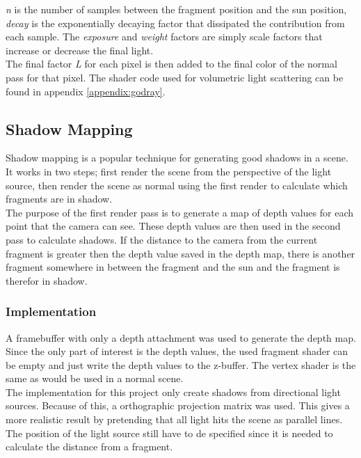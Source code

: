 \documentclass{article}
\begin{document}
  			\textit{n} is the number of samples between the fragment position and the sun position, \textit{decay} is the exponentially decaying factor that dissipated the contribution from each sample. The \textit{exposure} and \textit{weight} factors are simply scale factors that increase or decrease the final light. \\
  			
  			The final factor \textit{L} for each pixel is then added to the final color of the normal pass for that pixel. The shader code used for volumetric light scattering can be found in appendix \ref{appendix:godray}.
  		
  		\subsection{Shadow Mapping}
  			Shadow mapping is a popular technique for generating good shadows in a scene. It works in two steps; first render the scene from the perspective of the light source, then render the scene as normal using the first render to calculate which fragments are in shadow. \citep{ragnemalm2015so} \\
  			
  			The purpose of the first render pass is to generate a map of depth values for each point that the camera can see. These depth values are then used in the second pass to calculate shadows. If the distance to the camera from the current fragment is greater then the depth value saved in the depth map, there is another fragment somewhere in between the fragment and the sun and the fragment is therefor in shadow. \citep{ragnemalm2015so}
  			
  			\subsubsection*{Implementation}
  				
  				A framebuffer with only a depth attachment was used to generate the depth map. Since the only part of interest is the depth values, the used fragment shader can be empty and just write the depth values to the z-buffer. The vertex shader is the same as would be used in a normal scene. \\
  				
  				The implementation for this project only create shadows from directional light sources. Because of this, a orthographic projection matrix was used. This gives a more realistic result by pretending that all light hits the scene as parallel lines. The position of the light source still have to de specified since it is needed to calculate the distance from a fragment. \\
  				
\end{document}
